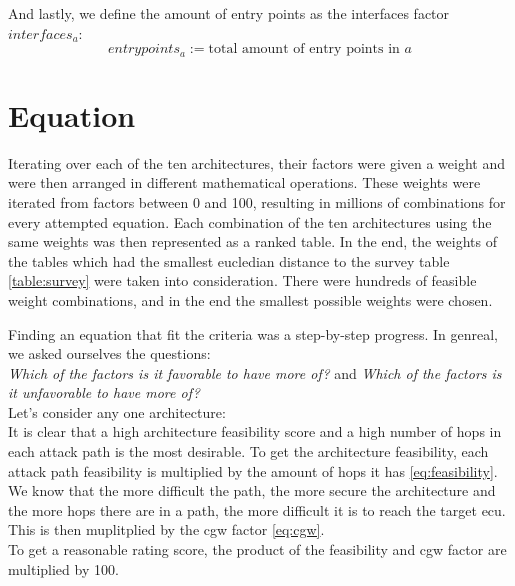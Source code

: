And lastly, we define the amount of entry points as the interfaces factor $interfaces_{a}$:\\
\begin{equation}
    entrypoints_{a} := \text{total amount of entry points in } a \label{eq:interfaces}
\end{equation}

\section{Equation}
\label{sec:equation}

Iterating over each of the ten architectures, their factors were given a weight and were then arranged in different mathematical operations.
These weights were iterated from factors between 0 and 100, resulting in millions of combinations for every attempted equation.
Each combination of the ten architectures using the same weights was then represented as a ranked table. 
In the end, the weights of the tables which had the smallest eucledian distance to the survey table \ref{table:survey} were taken into consideration.
There were hundreds of feasible weight combinations, and in the end the smallest possible weights were chosen.

Finding an equation that fit the criteria was a step-by-step progress.
In genreal, we asked ourselves the questions:\\
\textit{Which of the factors is it favorable to have more of?} and \textit{Which of the factors is it unfavorable to have more of?}\\

Let's consider any one architecture:\\
It is clear that a high architecture feasibility score and a high number of hops in each attack path is the most desirable.
To get the architecture feasibility, each attack path feasibility is multiplied by the amount of hops it has \ref{eq:feasibility}.
We know that the more difficult the path, the more secure the architecture and the more hops there are in a path, the more difficult it is to reach the target \acrshort{ecu}.\\
This is then muplitplied by the \acrshort{cgw} factor \ref{eq:cgw}.\\
To get a reasonable rating score, the product of the feasibility and \acrshort{cgw} factor are multiplied by 100.\\

